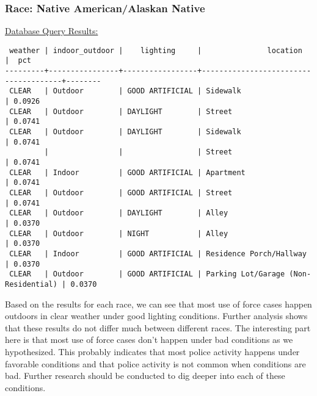 \documentclass[10pt]{article}
\begin{document}
\subsubsection*{Race: Native American/Alaskan Native}

\underline{Database Query Results:}

\begin{verbatim}
 weather | indoor_outdoor |    lighting     |               location               |  pct
---------+----------------+-----------------+--------------------------------------+--------
 CLEAR   | Outdoor        | GOOD ARTIFICIAL | Sidewalk                             | 0.0926
 CLEAR   | Outdoor        | DAYLIGHT        | Street                               | 0.0741
 CLEAR   | Outdoor        | DAYLIGHT        | Sidewalk                             | 0.0741
         |                |                 | Street                               | 0.0741
 CLEAR   | Indoor         | GOOD ARTIFICIAL | Apartment                            | 0.0741
 CLEAR   | Outdoor        | GOOD ARTIFICIAL | Street                               | 0.0741
 CLEAR   | Outdoor        | DAYLIGHT        | Alley                                | 0.0370
 CLEAR   | Outdoor        | NIGHT           | Alley                                | 0.0370
 CLEAR   | Indoor         | GOOD ARTIFICIAL | Residence Porch/Hallway              | 0.0370
 CLEAR   | Outdoor        | GOOD ARTIFICIAL | Parking Lot/Garage (Non-Residential) | 0.0370
\end{verbatim}

Based on the results for each race, we can see that most use of force cases happen outdoors in clear weather under good lighting conditions. Further analysis shows that these results do not differ much between different races. The interesting part here is that most use of force cases don't happen under bad conditions as we hypothesized. This probably indicates that most police activity happens under favorable conditions and that police activity is not common when conditions are bad. Further research should be conducted to dig deeper into each of these conditions.
\end{document}
